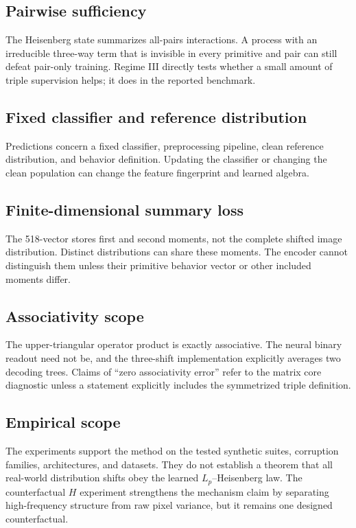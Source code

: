 \documentclass[11pt,a4paper]{article}
\begin{document}
\subsection{Pairwise sufficiency}

The Heisenberg state summarizes all-pairs interactions.  A process with an
irreducible three-way term that is invisible in every primitive and pair can
still defeat pair-only training.  Regime III directly tests whether a small
amount of triple supervision helps; it does in the reported benchmark.

\subsection{Fixed classifier and reference distribution}

Predictions concern a fixed classifier, preprocessing pipeline, clean reference
distribution, and behavior definition.  Updating the classifier or changing
the clean population can change the feature fingerprint and learned algebra.

\subsection{Finite-dimensional summary loss}

The 518-vector stores first and second moments, not the complete shifted image
distribution.  Distinct distributions can share these moments.  The encoder
cannot distinguish them unless their primitive behavior vector or other
included moments differ.

\subsection{Associativity scope}

The upper-triangular operator product is exactly associative.  The neural
binary readout need not be, and the three-shift implementation explicitly
averages two decoding trees.  Claims of ``zero associativity error'' refer to
the matrix core diagnostic unless a statement explicitly includes the
symmetrized triple definition.

\subsection{Empirical scope}

The experiments support the method on the tested synthetic suites, corruption
families, architectures, and datasets.  They do not establish a theorem that
all real-world distribution shifts obey the learned $L_p$--Heisenberg law.
The counterfactual $H$ experiment strengthens the mechanism claim by separating
high-frequency structure from raw pixel variance, but it remains one designed
counterfactual.
\end{document}

